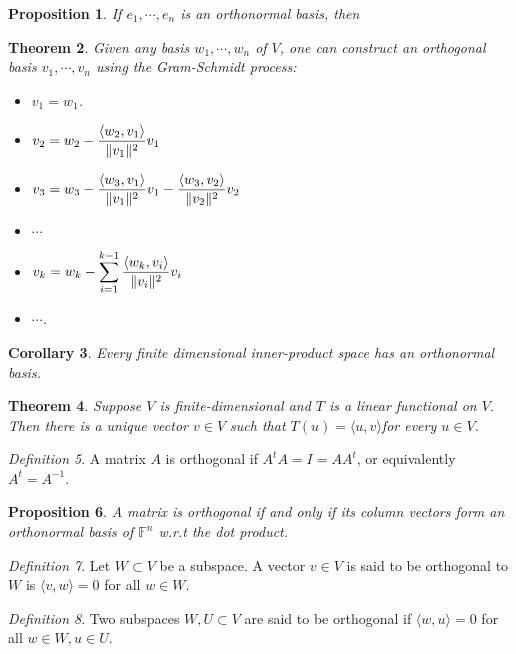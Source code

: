 \documentclass[12pt]{amsart}
\newcommand{\fff}[0]{\mathbb{F}}
\newtheorem{theorem}{Theorem}[section]
\newtheorem{proposition}[theorem]{Proposition}
\newtheorem{corollary}[theorem]{Corollary}
\theoremstyle{remark}
\newtheorem{definition}[theorem]{Definition}
\numberwithin{equation}{section}
\begin{document}
	\begin{proposition}
		If $e_1,\cdots,e_n$ is an orthonormal basis, then
		\[\]
	\end{proposition}
	\begin{theorem}
		Given any basis $w_1,\cdots,w_n$ of $V$, one can construct an orthogonal basis $v_1,\cdots,v_n$ using the Gram-Schmidt process:
		\begin{itemize}
			\item $v_1=w_1$.
			\item $\displaystyle v_2=w_2-{\langle w_2,v_1\rangle \over \Vert v_1\Vert ^2}v_1$
			\item $\displaystyle v_3=w_3-{\langle w_3,v_1\rangle \over \Vert v_1\Vert ^2}v_1-{\langle w_3,v_2\rangle \over \Vert v_2\Vert ^2}v_2$
			\item $\cdots$
			\item $\displaystyle v_k=w_k-\sum_{i=1}^{k-1}{\langle w_k,v_i\rangle \over \Vert v_i\Vert ^2}v_i$
			\item $\cdots$.
		\end{itemize}
	\end{theorem}
	\begin{corollary}
		Every finite dimensional inner-product space has an orthonormal basis.
	\end{corollary}
	
	\begin{theorem}
		Suppose $V$ is finite-dimensional and $T$ is a linear functional on $V$. Then there
is a unique vector $v\in V$ such that $T(u)=\langle u,v\rangle $for every $u\in V$.
	\end{theorem}
	\begin{definition}
		A matrix $A$ is orthogonal if $A^tA=I=AA^t$, or equivalently $A^t=A^{-1}$.
	\end{definition}
	\begin{proposition}
		A matrix is orthogonal if and only if its column vectors form an orthonormal basis of $\fff^n$ w.r.t the dot product.
	\end{proposition}
	
	\begin{definition}
		Let $W\subset V$ be a subspace. A vector $v\in V$ is said to be orthogonal to $W$ is $\langle v,w\rangle =0$ for all $w\in W$. 	\end{definition}
		
	
	\begin{definition}
		Two subspaces $W,U\subset V$ are said to be orthogonal if $\langle w,u\rangle =0$ for all $w\in W,u\in U$.	\end{definition}
	
\end{document}
